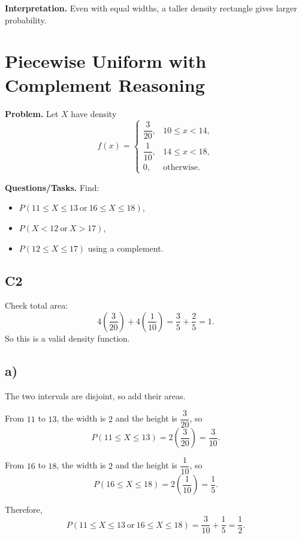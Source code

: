 \textbf{Interpretation.}
Even with equal widths, a taller density rectangle gives larger probability.

\section{Piecewise Uniform with Complement Reasoning}

\textbf{Problem.}
Let $X$ have density
\[
f(x)=
\begin{cases}
	\dfrac{3}{20}, & 10\le x<14,\\
	\dfrac{1}{10}, & 14\le x<18,\\
	0, & \text{otherwise.}
\end{cases}
\]

\textbf{Questions/Tasks.}
Find:
\begin{itemize}
	\item[(a)] $P(11\le X\le 13\ \text{or}\ 16\le X\le 18)$,
	\item[(b)] $P(X<12\ \text{or}\ X>17)$,
	\item[(c)] $P(12\le X\le 17)$ using a complement.
\end{itemize}

\subsection*{C2}
Check total area:
\[
4\left(\frac{3}{20}\right)+4\left(\frac{1}{10}\right)=\frac{3}{5}+\frac{2}{5}=1.
\]
So this is a valid density function.


\subsection*{a)}
The two intervals are disjoint, so add their areas.

From $11$ to $13$, the width is $2$ and the height is $\dfrac{3}{20}$, so
\[
P(11\le X\le 13)=2\left(\frac{3}{20}\right)=\frac{3}{10}.
\]

From $16$ to $18$, the width is $2$ and the height is $\dfrac{1}{10}$, so
\[
P(16\le X\le 18)=2\left(\frac{1}{10}\right)=\frac{1}{5}.
\]

Therefore,
\[
P(11\le X\le 13\ \text{or}\ 16\le X\le 18)=\frac{3}{10}+\frac{1}{5}=\frac{1}{2}.
\]


